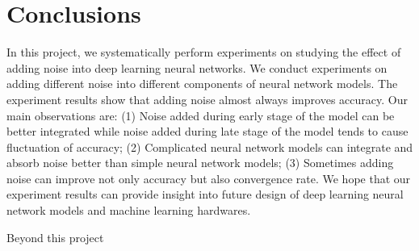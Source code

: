 \section{Conclusions}
\label{sec:conclusions}
In this project, we systematically perform experiments on studying the
effect of adding noise into deep learning neural networks.
We conduct experiments on adding different noise into different components
of neural network models. The experiment results show that adding noise almost always improves accuracy.
Our main observations are:
(1) Noise added during early stage of the model can be better integrated
while noise added during late stage of the model tends to cause
fluctuation of accuracy;
(2) Complicated neural network models can integrate and absorb
noise better than simple neural network models;
(3) Sometimes adding noise can improve not only accuracy but also
convergence rate.
We hope that our experiment results can provide insight into future design
of deep learning neural network models and machine learning hardwares.

Beyond this project
